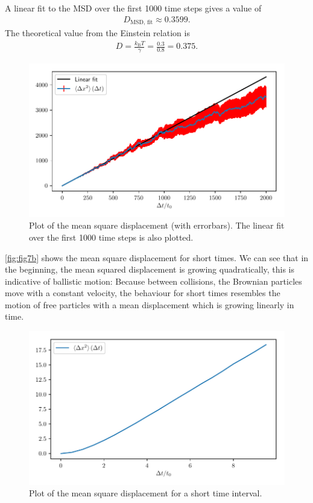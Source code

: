 \documentclass[a4paper,10pt,bibtotoc]{scrartcl}
\begin{document}
A linear fit to the MSD over the first 1000 time steps gives a value of 
\begin{align}
D_\text{MSD, fit} \approx 0.3599.
\end{align}
The theoretical value from the Einstein relation is
\begin{align}
D = \frac{k_\mathrm{B}T}{\gamma} = \frac{0.3}{0.8} = 0.375.
\end{align}
\begin{figure}[H]
	\centering
	\includegraphics[width=\linewidth]{msd.pdf}
	\caption{Plot of the mean square displacement (with errorbars). The linear fit over the first 1000 time steps is also plotted.}
	\label{fig:fig7}
\end{figure}
\autoref{fig:fig7b} shows the mean square displacement for short times.
We can see that in the beginning, the mean squared displacement is growing quadratically, this is indicative of ballistic motion:
Because between collisions, the Brownian particles move with a constant velocity, the behaviour for short times resembles the motion of free particles with a mean displacement which is growing linearly in time.
\begin{figure}[H]
	\centering
	\includegraphics[width=\linewidth]{msd_short_times.pdf}
	\caption{Plot of the mean square displacement for a short time interval.}
	\label{fig:fig7b}
\end{figure}
\end{document}
